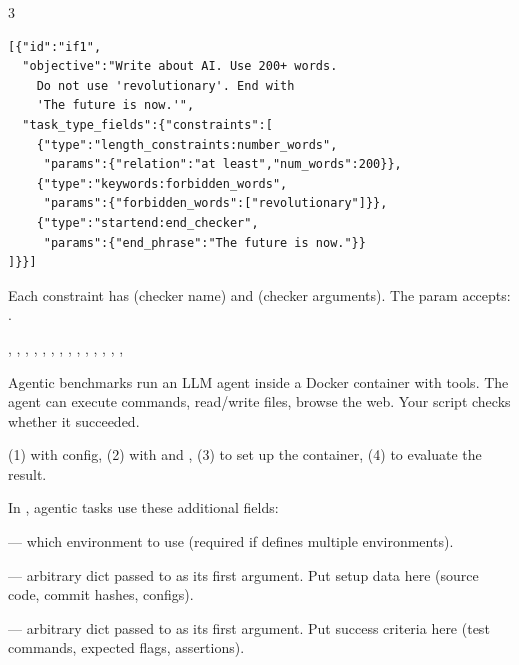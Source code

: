 \documentclass[10pt,landscape]{article}
\begin{document}
\begin{multicols}{3}
\begin{lstlisting}
[{"id":"if1",
  "objective":"Write about AI. Use 200+ words.
    Do not use 'revolutionary'. End with
    'The future is now.'",
  "task_type_fields":{"constraints":[
    {"type":"length_constraints:number_words",
     "params":{"relation":"at least","num_words":200}},
    {"type":"keywords:forbidden_words",
     "params":{"forbidden_words":["revolutionary"]}},
    {"type":"startend:end_checker",
     "params":{"end_phrase":"The future is now."}}
]}}]
\end{lstlisting}

Each constraint has  (checker name) and  (checker arguments). The  param accepts: .

 , , , , , , , , , , , , , , 


Agentic benchmarks run an LLM agent inside a Docker container with tools. The agent can execute commands, read/write files, browse the web. Your  script checks whether it succeeded.

 (1)  with  config, (2)  with  and , (3)  to set up the container, (4)  to evaluate the result.

In , agentic tasks use these additional fields:

 --- which environment to use (required if  defines multiple environments).

 --- arbitrary dict passed to  as its first argument. Put setup data here (source code, commit hashes, configs).

 --- arbitrary dict passed to  as its first argument. Put success criteria here (test commands, expected flags, assertions).


\end{multicols}
\end{document}
